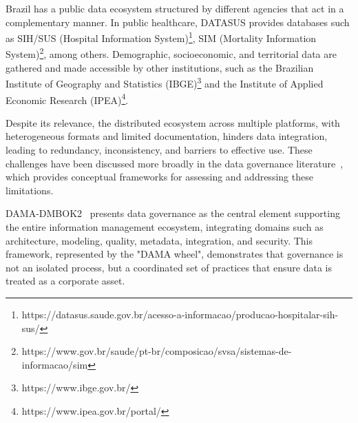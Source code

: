 \documentclass[sigconf,natbib=false]{acmart}
\begin{document}
Brazil has a public data ecosystem structured by different agencies that act in a complementary manner. In public healthcare, DATASUS provides databases such as SIH/SUS (Hospital Information System)\footnote{https://datasus.saude.gov.br/acesso-a-informacao/producao-hospitalar-sih-sus/}, SIM (Mortality Information System)\footnote{https://www.gov.br/saude/pt-br/composicao/svsa/sistemas-de-informacao/sim}, among others. Demographic, socioeconomic, and territorial data are gathered and made accessible by other institutions, such as the Brazilian Institute of Geography and Statistics (IBGE)\footnote{https://www.ibge.gov.br/} and the Institute of Applied Economic Research (IPEA)\footnote{https://www.ipea.gov.br/portal/}.

Despite its relevance, the distributed ecosystem across multiple platforms, with heterogeneous formats and limited documentation, hinders data integration, leading to redundancy, inconsistency, and barriers to effective use. These challenges have been discussed more broadly in the data governance literature~\cite{ladley2012}, which provides conceptual frameworks for assessing and addressing these limitations.

DAMA-DMBOK2~\cite{dama2017} presents data governance as the central element supporting the entire information management ecosystem, integrating domains such as architecture, modeling, quality, metadata, integration, and security. This framework, represented by the "DAMA wheel", demonstrates that governance is not an isolated process, but a coordinated set of practices that ensure data is treated as a corporate asset.
\end{document}
